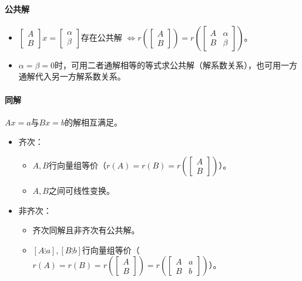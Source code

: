 \documentclass[
12pt, %
a4paper, 
oneside, %
headinclude,footinclude, %
]{scrartcl}
\begin{document}
\paragraph{公共解}
\begin{itemize}
\item $ \begin{bmatrix} A \\ B \end{bmatrix} x = \begin{bmatrix} \alpha \\ \beta \end{bmatrix} $存在公共解
$ \Leftrightarrow $$ r(\begin{bmatrix} A \\ B \end{bmatrix}) = r(\begin{bmatrix} A & \alpha \\ B & \beta \end{bmatrix}) $。
\item $ \alpha = \beta = 0 $时，可用二者通解相等的等式求公共解（解系数关系），也可用一方通解代入另一方解系数关系。
\end{itemize}
\paragraph{同解}
$ Ax = a $与$ Bx = b $的解相互满足。
\begin{itemize}
\item 齐次：
\begin{itemize}
\item $ A,B $行向量组等价（$ r(A) = r(B) = r(\begin{bmatrix} A \\ B \end{bmatrix}) $）。
\item $ A,B $之间可线性变换。
\end{itemize}
\item 非齐次：
\begin{itemize}
\item 齐次同解且非齐次有公共解。
\item $ [A \vdots a],[B \vdots b] $行向量组等价（$ r(A) = r(B) = r(\begin{bmatrix} A \\ B \end{bmatrix}) = r(\begin{bmatrix} A & a \\ B & b \end{bmatrix}) $）。
\end{itemize}
\end{itemize}
\end{document}
